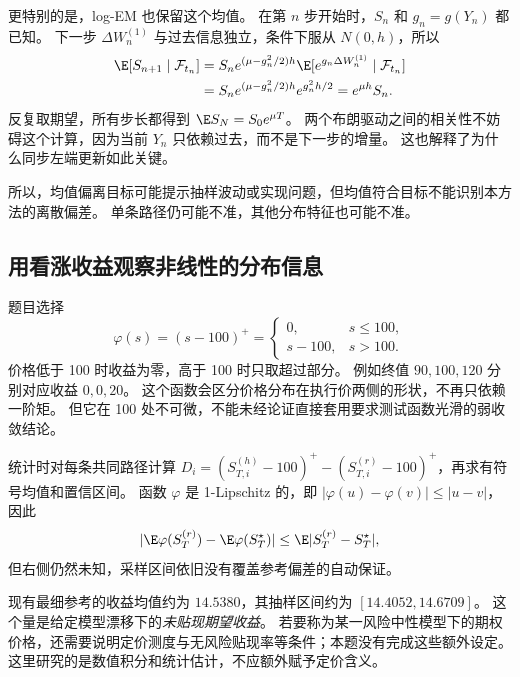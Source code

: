 更特别的是，log-EM 也保留这个均值。
在第 $n$ 步开始时，$S_n$ 和 $g_n=g(Y_n)$ 都已知。
下一步 $\Delta W_n^{(1)}$ 与过去信息独立，条件下服从 $N(0,h)$，所以
\begin{equation}\label{eq:ref-discrete-mean}
\begin{aligned}
 \E[S_{n+1}\mid\mathcal F_{t_n}]
 &=S_ne^{(\mu-g_n^2/2)h}\E[e^{g_n\Delta W_n^{(1)}}\mid\mathcal F_{t_n}]\\
 &=S_ne^{(\mu-g_n^2/2)h}e^{g_n^2h/2}=e^{\mu h}S_n.
\end{aligned}
\end{equation}
反复取期望，所有步长都得到 $\E S_N=S_0e^{\mu T}$。
两个布朗驱动之间的相关性不妨碍这个计算，因为当前 $Y_n$ 只依赖过去，而不是下一步的增量。
这也解释了为什么同步左端更新如此关键。

所以，均值偏离目标可能提示抽样波动或实现问题，但均值符合目标不能识别本方法的离散偏差。
单条路径仍可能不准，其他分布特征也可能不准。

\subsection{用看涨收益观察非线性的分布信息}
题目选择
\begin{equation}\label{eq:ref-payoff}
 \varphi(s)=(s-100)^+=\begin{cases}0,&s\le100,\\s-100,&s>100.\end{cases}
\end{equation}
价格低于 100 时收益为零，高于 100 时只取超过部分。
例如终值 $90,100,120$ 分别对应收益 $0,0,20$。
这个函数会区分价格分布在执行价两侧的形状，不再只依赖一阶矩。
但它在 100 处不可微，不能未经论证直接套用要求测试函数光滑的弱收敛结论。

统计时对每条共同路径计算 $D_i=(S_{T,i}^{(h)}-100)^+-(S_{T,i}^{(r)}-100)^+$，再求有符号均值和置信区间。
函数 $\varphi$ 是 1-Lipschitz 的，即 $|\varphi(u)-\varphi(v)|\le|u-v|$，因此
\begin{equation}\label{eq:ref-payoff-bound}
 |\E\varphi(S_T^{(r)})-\E\varphi(S_T^\star)|
 \le\E|S_T^{(r)}-S_T^\star|,
\end{equation}
但右侧仍然未知，采样区间依旧没有覆盖参考偏差的自动保证。

现有最细参考的收益均值约为 $14.5380$，其抽样区间约为 $[14.4052,14.6709]$。
这个量是给定模型漂移下的\emph{未贴现期望收益}。
若要称为某一风险中性模型下的期权价格，还需要说明定价测度与无风险贴现率等条件；本题没有完成这些额外设定。
这里研究的是数值积分和统计估计，不应额外赋予定价含义。
